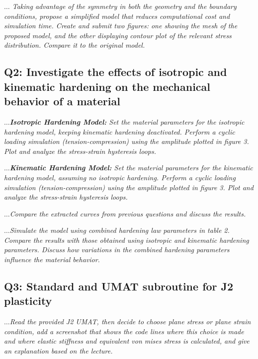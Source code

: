 \documentclass[12pt]{article}
\begin{document}
\vspace{1em}
\textit{$\dots$ Taking advantage of the symmetry in both the geometry and the boundary conditions, 
propose a simplified model that reduces computational cost and simulation time. 
Create and submit two figures: one showing the mesh of the proposed model, 
and the other displaying contour plot of the relevant stress distribution. 
Compare it to the original model.}


\newpage
\subsection*{Q2: Investigate the effects of isotropic and kinematic hardening on the mechanical behavior of a material}

\vspace{1em}
\textit{$\dots$\textbf{Isotropic Hardening Model:} Set the material parameters for the 
isotropic hardening model, keeping kinematic hardening deactivated. 
Perform a cyclic loading simulation (tension-compression) 
using the amplitude plotted in figure 3. Plot and analyze the stress-strain hysteresis loops.}
\vspace{1em}

\textit{$\dots$\textbf{Kinematic Hardening Model:} Set the material parameters for 
the kinematic hardening model, assuming no isotropic hardening. 
Perform a cyclic loading simulation (tension-compression) using 
the amplitude plotted in figure 3. 
Plot and analyze the stress-strain hysteresis loops.}
\vspace{1em}

\textit{$\dots$Compare the extracted curves from previous questions and discuss the results.}
\vspace{1em}

\textit{$\dots$Simulate the model using combined hardening law parameters in table 2. 
Compare the results with those obtained using isotropic and kinematic hardening parameters. 
Discuss how variations in the combined hardening parameters influence the material behavior.}
\vspace{1em}

\subsection*{Q3: Standard and UMAT subroutine for J2 plasticity}
\vspace{1em}
\textit{$\dots$Read the provided J2 UMAT, then decide to choose plane stress or plane strain condition, add
a screenshot that shows the code lines where this choice is made and where elastic stiffness
and equivalent von mises stress is calculated, and give an explanation based on the lecture.}
\vspace{1em}
\end{document}

